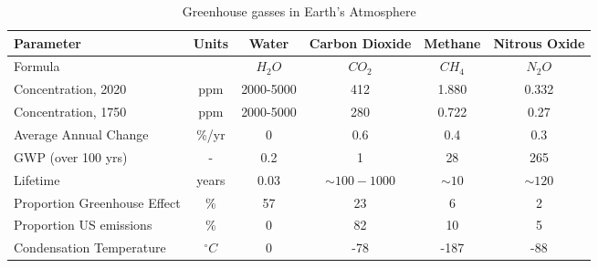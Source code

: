 \begin{table} 
\centering
\caption{Greenhouse gasses in Earth's Atmosphere}
\label{tab:ghgconcs}
\begin{tabular}{@{}lccccc@{}} \toprule
Parameter				&Units		    &Water		  &Carbon Dioxide		&Methane	&Nitrous Oxide\\ \midrule
Formula					&             &$H_2O$		  &$CO_2$      			&$CH_4$		&$N_2O$\\
Concentration, 2020	  &ppm	  &2000-5000	&412	            &1.880	  &0.332\\
Concentration, 1750	  &ppm	  &2000-5000	&280	            &0.722	  &0.27\\
Average Annual Change	&\%/yr  &0	        &0.6	            &0.4	    &0.3\\
GWP (over 100 yrs)	  &-	    &0.2	      &1	              &28	      &265\\
Lifetime	            &years	&0.03	      &$\sim 100-1000$	&$\sim10$	&$\sim120$\\
Proportion Greenhouse Effect	&\%		&57	  &23	              &6	      &2\\ 
Proportion US emissions	&\%	  &0	        &82	              &10	      &5\\
Condensation Temperature& $^{\circ}C$ &0	  &-78	            &-187	    &-88\\ \bottomrule
\end{tabular}
\end{table}

